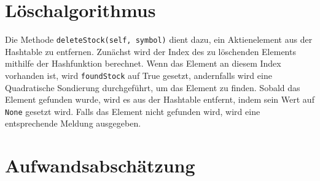 \documentclass{proc}
\begin{document}
\section*{Löschalgorithmus}
Die Methode \texttt{deleteStock(self, symbol)} dient dazu, ein Aktienelement aus der Hashtable zu entfernen. Zunächst wird der Index des zu löschenden Elements mithilfe der Hashfunktion 
berechnet. Wenn das Element an diesem Index vorhanden ist, wird \texttt{foundStock} auf True gesetzt, andernfalls wird eine Quadratische Sondierung durchgeführt, um das Element zu finden. 
Sobald das Element gefunden wurde, wird es aus der Hashtable entfernt, indem sein Wert auf \texttt{None} gesetzt wird. Falls das Element nicht gefunden wird, wird eine entsprechende Meldung ausgegeben.

\section*{Aufwandsabschätzung}
\end{document}
